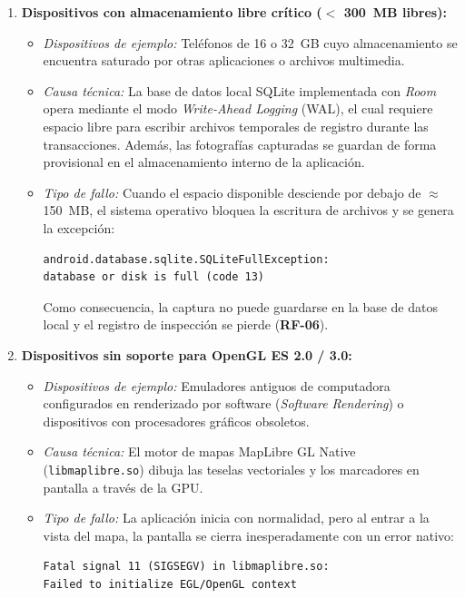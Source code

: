 \begin{enumerate}[label=\textbf{\arabic*.}]
    \item \textbf{Dispositivos con almacenamiento libre crítico ($<$ 300~MB libres):}
    \begin{itemize}
        \item \textit{Dispositivos de ejemplo:} Teléfonos de 16 o 32~GB cuyo almacenamiento se encuentra saturado por otras aplicaciones o archivos multimedia.
        \item \textit{Causa técnica:} La base de datos local SQLite implementada con \textit{Room} opera mediante el modo \textit{Write-Ahead Logging} (WAL), el cual requiere espacio libre para escribir archivos temporales de registro durante las transacciones. Además, las fotografías capturadas se guardan de forma provisional en el almacenamiento interno de la aplicación.
        \item \textit{Tipo de fallo:} Cuando el espacio disponible desciende por debajo de $\approx$150~MB, el sistema operativo bloquea la escritura de archivos y se genera la excepción:
\begin{verbatim}
android.database.sqlite.SQLiteFullException:
database or disk is full (code 13)
\end{verbatim}
        Como consecuencia, la captura no puede guardarse en la base de datos local y el registro de inspección se pierde (\textbf{RF-06}).
    \end{itemize}

    \item \textbf{Dispositivos sin soporte para OpenGL ES 2.0 / 3.0:}
    \begin{itemize}
        \item \textit{Dispositivos de ejemplo:} Emuladores antiguos de computadora configurados en renderizado por software (\textit{Software Rendering}) o dispositivos con procesadores gráficos obsoletos.
        \item \textit{Causa técnica:} El motor de mapas MapLibre GL Native (\texttt{libmaplibre.so}) dibuja las teselas vectoriales y los marcadores en pantalla a través de la GPU.
        \item \textit{Tipo de fallo:} La aplicación inicia con normalidad, pero al entrar a la vista del mapa, la pantalla se cierra inesperadamente con un error nativo:
\begin{verbatim}
Fatal signal 11 (SIGSEGV) in libmaplibre.so:
Failed to initialize EGL/OpenGL context
\end{verbatim}
    \end{itemize}
\end{enumerate}

